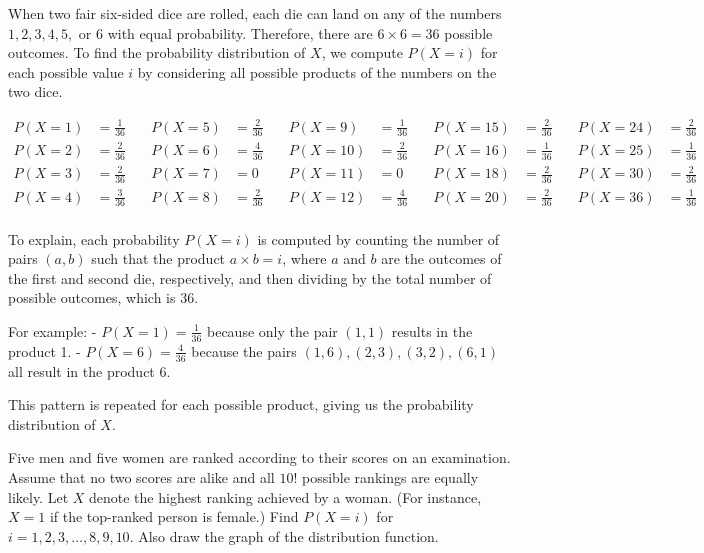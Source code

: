 \begin{solution}
When two fair six-sided dice are rolled, each die can land on any of the numbers \(1, 2, 3, 4, 5,\) or \(6\) with equal probability. Therefore, there are \(6 \times 6 = 36\) possible outcomes. To find the probability distribution of \(X\), we compute \(P(X = i)\) for each possible value \(i\) by considering all possible products of the numbers on the two dice.

\[
\begin{aligned}
P(X = 1) &= \frac{1}{36} & \quad P(X = 5) &= \frac{2}{36} & \quad P(X = 9) &= \frac{1}{36} & \quad P(X = 15) &= \frac{2}{36} & \quad P(X = 24) &= \frac{2}{36} \\
P(X = 2) &= \frac{2}{36} & \quad P(X = 6) &= \frac{4}{36} & \quad P(X = 10) &= \frac{2}{36} & \quad P(X = 16) &= \frac{1}{36} & \quad P(X = 25) &= \frac{1}{36} \\
P(X = 3) &= \frac{2}{36} & \quad P(X = 7) &= 0 & \quad P(X = 11) &= 0 & \quad P(X = 18) &= \frac{2}{36} & \quad P(X = 30) &= \frac{2}{36} \\
P(X = 4) &= \frac{3}{36} & \quad P(X = 8) &= \frac{2}{36} & \quad P(X = 12) &= \frac{4}{36} & \quad P(X = 20) &= \frac{2}{36} & \quad P(X = 36) &= \frac{1}{36} \\
\end{aligned}
\]

To explain, each probability \(P(X = i)\) is computed by counting the number of pairs \((a, b)\) such that the product \(a \times b = i\), where \(a\) and \(b\) are the outcomes of the first and second die, respectively, and then dividing by the total number of possible outcomes, which is 36.

For example:
- \(P(X = 1) = \frac{1}{36}\) because only the pair \((1, 1)\) results in the product 1.
- \(P(X = 6) = \frac{4}{36}\) because the pairs \((1, 6), (2, 3), (3, 2), (6, 1)\) all result in the product 6.

This pattern is repeated for each possible product, giving us the probability distribution of \(X\).

\end{solution}

\begin{exercise}
Five men and five women are ranked according to their scores on an examination. Assume that no two scores are alike and all \(10!\) possible rankings are equally likely. Let \(X\) denote the highest ranking achieved by a woman. (For instance, \(X = 1\) if the top-ranked person is female.) Find \(P(X = i)\) for \(i = 1, 2, 3, \ldots, 8, 9, 10\). Also draw the graph of the distribution function.
\end{exercise}

